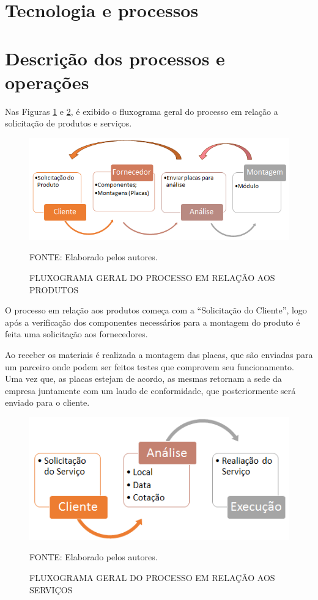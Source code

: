 \documentclass[
	12pt,				%
	openright,			%
	oneside,			%
	a4paper,			%
	english,			%
	french,				%
	spanish,			%
	brazil				%
	]{abntex2}
\begin{document}
\section[Tecnologia e processos]{Tecnologia e processos}

\section[Descrição dos processos e operações]{Descrição dos processos e operações}

	Nas Figuras \ref{X} e \ref{X-1}, é exibido o fluxograma geral do processo em relação a solicitação de produtos e serviços.
	
	\begin{figure}[th]
		\caption{FLUXOGRAMA GERAL DO PROCESSO EM RELAÇÃO AOS PRODUTOS}
		\label{X}
		\centering
		\includegraphics[width=1.0\linewidth]{./figs/X}
		
		\begin{small}
			FONTE: Elaborado pelos autores.
		\end{small}
	\end{figure}
	
	O processo em relação aos produtos começa com a “Solicitação do Cliente”, logo após a verificação dos componentes necessários para a montagem do produto é feita uma solicitação aos fornecedores.
	
	Ao receber os materiais é realizada a montagem das placas, que são enviadas para um parceiro onde podem ser feitos testes que comprovem seu funcionamento. Uma vez que, as placas estejam de acordo, as mesmas retornam a sede da empresa juntamente com um laudo de conformidade, que posteriormente será enviado para o cliente.
	 
	 \begin{figure}[th]
		\caption{FLUXOGRAMA GERAL DO PROCESSO EM RELAÇÃO AOS SERVIÇOS}
		\label{X-1}
		\centering
		\includegraphics[width=0.8\linewidth]{./figs/X-1}
		
		\begin{small}
			FONTE: Elaborado pelos autores.
		\end{small}
	\end{figure}
	
\end{document}
